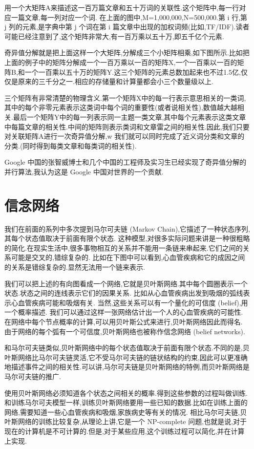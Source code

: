 \documentclass{article}
\begin{document}
用一个大矩阵A来描述这一百万篇文章和五十万词的关联性.这个矩阵中,每一行对应一篇文章,每一列对应一个词. 在上面的图中,M=1,000,000,N=500,000.第 i 行,第 j 列的元素,是字典中第 j 个词在第 i 篇文章中出现的加权词频(比如,TF/IDF).读者可能已经注意到了,这个矩阵非常大,有一百万乘以五十万,即五千亿个元素.

奇异值分解就是把上面这样一个大矩阵,分解成三个小矩阵相乘,如下图所示.比如把上面的例子中的矩阵分解成一个一百万乘以一百的矩阵X,一个一百乘以一百的矩阵B,和一个一百乘以五十万的矩阵Y.这三个矩阵的元素总数加起来也不过1.5亿,仅仅是原来的三千分之一.相应的存储量和计算量都会小三个数量级以上.

三个矩阵有非常清楚的物理含义.第一个矩阵X中的每一行表示意思相关的一类词,其中的每个非零元素表示这类词中每个词的重要性(或者说相关性),数值越大越相关.最后一个矩阵Y中的每一列表示同一主题一类文章,其中每个元素表示这类文章中每篇文章的相关性.中间的矩阵则表示类词和文章雷之间的相关性.因此,我们只要对关联矩阵A进行一次奇异值分解,w 我们就可以同时完成了近义词分类和文章的分类.(同时得到每类文章和每类词的相关性).

Google 中国的张智威博士和几个中国的工程师及实习生已经实现了奇异值分解的并行算法,我认为这是 Google 中国对世界的一个贡献.

\section{信念网络}
我们在前面的系列中多次提到马尔可夫链 (Markov Chain),它描述了一种状态序列,其每个状态值取决于前面有限个状态.
这种模型,对很多实际问题来讲是一种很粗略的简化.在现实生活中,很多事物相互的关系并不能用一条链来串起来.它们之间的关系可能是交叉的,错综复杂的.
比如在下图中可以看到,心血管疾病和它的成因之间的关系是错综复杂的.显然无法用一个链来表示.

我们可以把上述的有向图看成一个网络,它就是贝叶斯网络.其中每个圆圈表示一个状态.状态之间的连线表示它们的因果关系.
比如从心血管疾病出发到吸烟的弧线表示心血管疾病可能和吸烟有关.
当然,这些关系可以有一个量化的可信度 (belief),用一个概率描述.
我们可以通过这样一张网络估计出一个人的心血管疾病的可能性.
在网络中每个节点概率的计算,可以用贝叶斯公式来进行,贝叶斯网络因此而得名.
由于网络的每个弧有一个可信度,贝叶斯网络也被称作信念网络 (belief networks).

和马尔可夫链类似,贝叶斯网络中的每个状态值取决于前面有限个状态.不同的是,贝叶斯网络比马尔可夫链灵活,它不受马尔可夫链的链状结构的约束,因此可以更准确地描述事件之间的相关性.可以讲,马尔可夫链是贝叶斯网络的特例,而贝叶斯网络是马尔可夫链的推广.

使用贝叶斯网络必须知道各个状态之间相关的概率.得到这些参数的过程叫做训练.和训练马尔可夫模型一样,训练贝叶斯网络要用一些已知的数据.比如在训练上面的网络,需要知道一些心血管疾病和吸烟,家族病史等有关的情况.
相比马尔可夫链,贝叶斯网络的训练比较复杂,从理论上讲,它是一个 NP-complete 问题,也就是说,对于现在的计算机是不可计算的.但是,对于某些应用,这个训练过程可以简化,并在计算上实现.
\end{document}
